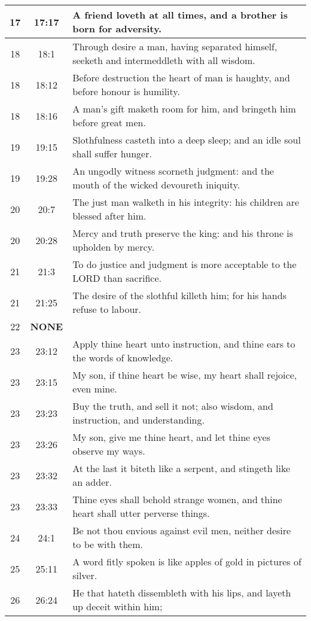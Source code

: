 \begin{center}
\begin{longtable}{c|c|p{3.5in}}
17 & 17:17 &  A friend loveth at all times, and a brother is born for adversity. \\   \hline
18 & 18:1 & Through desire a man, having separated himself, seeketh and intermeddleth
with all wisdom.  \\  
18 & 18:12 & Before destruction the heart of man is haughty, and before honour is humility.  \\  
18 & 18:16 & A man’s gift maketh room for him, and bringeth him before great men.  \\  \hline
19 & 19:15 & Slothfulness casteth into a deep sleep; and an idle soul shall suffer hunger. \\ 
19 & 19:28 & An ungodly witness scorneth judgment: and the mouth of the wicked devoureth iniquity.  \\  \hline
20 & 20:7 & The just man walketh in his integrity: his
children are blessed after him.  \\  
20 & 20:28 & Mercy and truth preserve the king: and his throne is upholden by mercy.  \\  \hline
21 & 21:3 & To do justice and judgment is more acceptable to the LORD than sacrifice.  \\  
21 & 21:25 &  The desire of the slothful killeth him; for his hands refuse to labour.   \\   \hline
22 & \textbf{\textcolor[rgb]{0.00,1.00,0.00}{NONE}}  &\\ \hline
23 & 23:12 & Apply thine heart unto instruction, and thine ears to the words of knowledge.  \\ 
23 & 23:15 & My son, if thine heart be wise, my heart shall rejoice, even mine.\\
23 & 23:23 & Buy the truth, and sell it not; also wisdom, and instruction, and understanding. \\ 
23 & 23:26 & My son, give me thine heart, and let thine eyes observe my ways.\\ 
23 & 23:32 & At the last it biteth like a serpent, and stingeth like an adder. \\ 
23 & 23:33 & Thine eyes shall behold strange women, and thine heart shall utter perverse things. \\ \hline
24 & 24:1 & Be  not thou envious against evil men, neither desire to be with them. \\ \hline
25 & 25:11 & A word fitly spoken is like apples of gold in pictures of silver. \\ \hline
26 & 26:24 & He that hateth dissembleth with his lips, and layeth up deceit within him;\\ \hline

\end{longtable}
\end{center}

